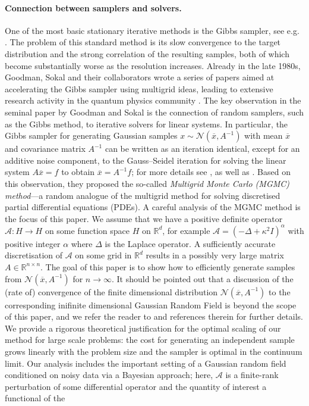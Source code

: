 \documentclass[11pt,english]{article}
\theoremstyle{plain}
\theoremstyle{plain}
\theoremstyle{plain}
\theoremstyle{plain}
\numberwithin{equation}{section}
\newcommand*{\id}{I}
\newcommand{\rev}[1]{#1}
\begin{document}
\paragraph{Connection between samplers and solvers.}
One of the most basic stationary iterative methods is the Gibbs sampler, see e.g. \cite{RobertEtAl.CP_2004_MonteCarloStatistical,GelmanEtAl.A_2013_BayesianDataAnalysis,RubinsteinEtAl.RY_2016_SimulationMonteCarlo}. The problem of this standard method is its slow convergence to the target distribution and the strong correlation of the resulting samples, both of which become substantially worse as the resolution increases. Already in the late 1980s, Goodman, Sokal and their collaborators wrote a series of papers aimed at accelerating the Gibbs sampler using multigrid ideas, leading to extensive research activity in the quantum physics community \cite{goodman1989multigrid,edwards1992multi,edwards1991multi,mana1996dynamic,mendes1996multi}. The key observation in the seminal paper by Goodman and Sokal \cite{goodman1989multigrid} is the connection of random samplers, such as the Gibbs method, to iterative solvers for linear systems. In particular, the Gibbs sampler for generating Gaussian samples $x \sim\mathcal{N}(\overline{x},A^{-1})$ with mean $\overline{x}$ and covariance matrix $A^{-1}$ can be written as an iteration identical, except for an additive noise component, to the Gauss--Seidel iteration for solving the linear system $A\overline{x}=f$ to obtain $\overline{x}=A^{-1}f$; for more details see \cite{goodman1989multigrid}, as well as \cite{Sokal1997,Fox.C_Parker_2017_AcceleratedGibbsSampling}. Based on this observation, they proposed the so-called \emph{Multigrid Monte Carlo (MGMC) method}---a random analogue of the multigrid method for solving discretised partial differential equations (PDEs). A careful analysis of the MGMC method is the focus of this paper. We assume that we have a positive definite operator $\mathcal A: H \to H$ on some function space $H$ on $\mathbb{R}^d$, for example $\mathcal{A} = (-\Delta+\kappa^2 \id)^\alpha$ with positive integer $\alpha$ where $\Delta$ is the Laplace operator. A sufficiently accurate discretisation of $\mathcal A$ on some grid in $\mathbb{R}^d$ results in a possibly very large matrix $A \in \mathbb{R}^{n \times n}$. The goal of this paper is to show how to efficiently generate samples from $\mathcal{N}(\overline{x},A^{-1})$ for $n\rightarrow\infty$. \rev{It should be pointed out that a discussion of the (rate of) convergence of the finite dimensional distribution $\mathcal{N}(\overline{x},A^{-1})$ to the corresponding inifinite dimensional Gaussian Random Field is beyond the scope of this paper, and we refer the reader to \cite{LindgrenEtAl.F_2022_SPDEApproachGaussian} and references therein for further details.} We provide a rigorous theoretical justification for the optimal scaling of our method for large scale problems: the cost for generating an independent sample grows linearly with the problem size and the sampler is optimal in the continuum limit. Our analysis includes the important setting of a Gaussian random field conditioned on noisy data via a Bayesian approach; here, $\mathcal A$ is a finite-rank perturbation of some differential operator and the quantity of interest a functional of the 
\end{document}
